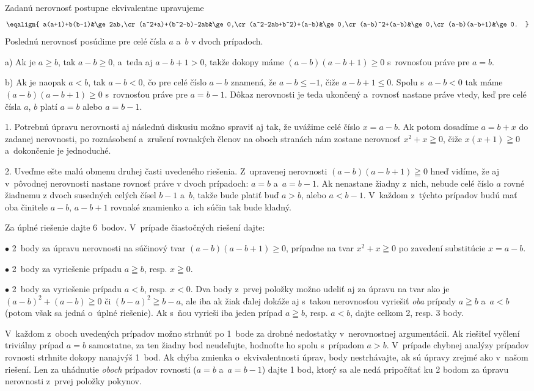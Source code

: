 {%
Zadanú nerovnosť postupne ekvivalentne upravujeme
$$
\eqalign{
a(a+1)+b(b-1)&\ge 2ab,\cr
(a^2+a)+(b^2-b)-2ab&\ge0,\cr
(a^2-2ab+b^2)+(a-b)&\ge0,\cr
(a-b)^2+(a-b)&\ge0,\cr
(a-b)(a-b+1)&\ge0.
}
$$
Poslednú nerovnosť posúdime pre celé čísla $a$ a~$b$ v dvoch
prípadoch.
\item{a)} Ak je $a \ge b$, tak $a-b \ge 0$, a~teda aj $a-b+1>0$, takže
dokopy máme
${(a-b)(a-b+1)} \ge 0$ s~rovnosťou práve pre $a=b$.
\item{b)} Ak je naopak $a<b$, tak $a-b<0$, čo pre celé číslo $a-b$ znamená,
že $a-b \leq {-1}$, čiže $a-b+1 \leq 0$. Spolu s~$a-b<0$ tak
máme $(a-b)(a-b+1) \ge 0$ s~rovnosťou práve pre $a=b-1$.
\endgraf\noindent
Dôkaz nerovnosti je teda ukončený a~rovnosť nastane práve vtedy, keď
pre celé čísla $a$, $b$ platí $a=b$ alebo $a=b-1$.

\poznamky
\item{1.} Potrebnú úpravu nerovnosti aj následnú diskusiu možno
spraviť aj tak, že uvážime celé číslo $x=a-b$. Ak potom dosadíme
$a=b+x$ do zadanej nerovnosti, po roznásobení a~zrušení rovnakých
členov na oboch stranách nám zostane nerovnosť $x^2+x\geqq0$, čiže
$x(x+1)\geqq0$ a~dokončenie je jednoduché.
\item{2.} Uveďme ešte malú obmenu druhej časti uvedeného riešenia.
Z~upravenej nerovnosti $(a-b)(a-b+1)\geqq0$ hneď vidíme, že
aj v~pôvodnej nerovnosti nastane rovnosť práve v dvoch prípadoch: $a=b$
a~$a=b-1$. Ak nenastane žiadny z~nich, nebude celé číslo $a$
rovné žiadnemu z dvoch susedných celých čísel $b-1$ a~$b$, takže
bude platiť buď $a>b$, alebo $a<b-1$. V~každom z~týchto
prípadov budú mať oba činitele $a-b$, $a-b+1$ rovnaké znamienko
a~ich súčin tak bude kladný.


\schemaABC
Za úplné riešenie dajte 6~bodov. V~prípade čiastočných riešení dajte:
\item{$\bullet$} 2~body za úpravu nerovnosti na súčinový tvar $(a-b)(a-b+1)\geq0$, prípadne na tvar $x^2+x\geqq0$ po zavedení substitúcie $x=a-b$.
\item{$\bullet$} 2~body za vyriešenie prípadu $a\geqq b$, resp. $x\geqq0$.
\item{$\bullet$} 2~body za vyriešenie prípadu $a<b$, resp. $x<0$.
\endgraf\noindent
Dva body z~prvej položky možno udeliť aj za úpravu na
tvar ako je $(a-b)^2+(a-b)\geqq0$ či $(b-a)^2\geqq b-a$,
ale iba ak žiak ďalej dokáže aj s~takou nerovnosťou vyriešiť
\emph{oba} prípady $a\geqq b$ a~$a<b$ (potom však sa jedná o~úplné
riešenie). Ak s~ňou vyrieši iba jeden prípad $a\geqq b$, resp. $a<b$,
dajte celkom 2, resp. 3 body.

V~každom z~oboch uvedených prípadov možno strhnúť po 1~bode za drobné nedostatky
v~nerovnostnej argumentácii. Ak riešiteľ vyčlení triviálny prípad $a=b$ samostatne, za ten žiadny bod neudeľujte,
hodnoťte ho spolu s~prípadom $a>b$. V~prípade chybnej analýzy prípadov
rovnosti strhnite dokopy nanajvýš 1~bod. Ak chýba zmienka
o~ekvivalentnosti úprav, body nestrhávajte, ak sú úpravy zrejmé ako
v~našom riešení. Len za uhádnutie \emph{oboch} prípadov rovnosti
($a=b$ a~$a=b-1$) dajte 1 bod, ktorý sa ale nedá pripočítať ku 2
bodom za úpravu nerovnosti z~prvej položky pokynov.
\endschema
}

